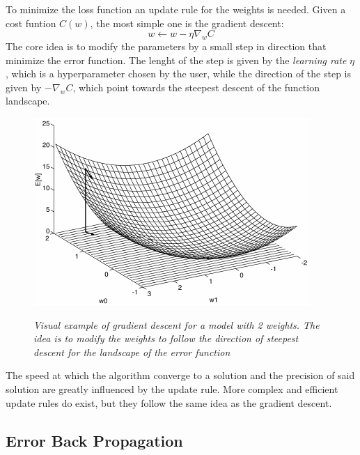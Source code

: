 \documentclass[12pt,a4paper]{report}
\begin{document}
To minimize the loss function an update rule for the weights is needed. 
Given a cost funtion $C(w)$, the most simple one is the gradient descent:
\begin{equation}
 w \leftarrow w - \eta \nabla_w C
\end{equation}
The core idea is to modify the parameters by a small step in direction that minimize the error function. 
The lenght of the step is given by the {\it learning rate} $\eta$, which is a hyperparameter chosen by the user, while the direction of the step is given by $-\nabla_w C$, which point towards the steepest descent of the function landscape.

\begin{figure}[h]
 \centering
 \includegraphics[scale=0.8]{./images/sgd.png}
 \label{fig:gd}
 \caption{\it Visual example of gradient descent for a model with 2 weights. The idea is to modify the weights to follow the direction of steepest descent for the landscape of the error function}
\end{figure}
The speed at which the algorithm converge to a solution and the precision of said solution are greatly influenced by the update rule. More complex and efficient update rules do exist, but they follow the same idea as the gradient descent.

\subsection*{Error Back Propagation}
\end{document}
